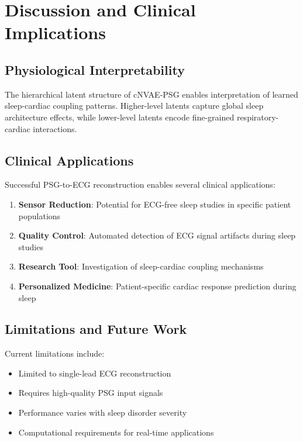\documentclass[11pt]{article}
\begin{document}
\section{Discussion and Clinical Implications}

\subsection{Physiological Interpretability}

The hierarchical latent structure of cNVAE-PSG enables interpretation of learned sleep-cardiac coupling patterns. Higher-level latents capture global sleep architecture effects, while lower-level latents encode fine-grained respiratory-cardiac interactions.

\subsection{Clinical Applications}

Successful PSG-to-ECG reconstruction enables several clinical applications:

\begin{enumerate}
    \item \textbf{Sensor Reduction}: Potential for ECG-free sleep studies in specific patient populations
    \item \textbf{Quality Control}: Automated detection of ECG signal artifacts during sleep studies
    \item \textbf{Research Tool}: Investigation of sleep-cardiac coupling mechanisms
    \item \textbf{Personalized Medicine}: Patient-specific cardiac response prediction during sleep
\end{enumerate}

\subsection{Limitations and Future Work}

Current limitations include:

\begin{itemize}
    \item Limited to single-lead ECG reconstruction
    \item Requires high-quality PSG input signals
    \item Performance varies with sleep disorder severity
    \item Computational requirements for real-time applications
\end{itemize}
\end{document}
